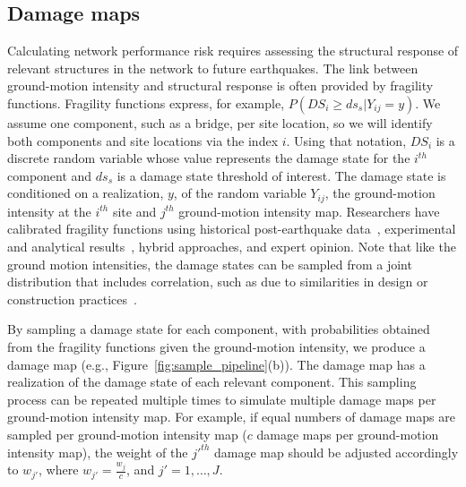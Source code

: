 \subsection{Damage maps}
Calculating network performance risk requires assessing the structural response of relevant structures in the network to future earthquakes. The link between ground-motion intensity and structural response is often provided by fragility functions. Fragility functions express, for example, $P(DS_i \geq ds_s | Y_{ij} = y)$. We assume one component, such as a bridge, per site location, so we will identify both components and site locations via the index $i$. Using that notation, $DS_i$ is a discrete random variable whose value represents the damage state for the $i^{th}$ component and $ds_s$ is a damage state threshold of interest. The damage state is conditioned on a realization, $y$, of the random variable $Y_{ij}$, the ground-motion intensity at the $i^{th}$ site and $j^{th}$ ground-motion intensity map. Researchers have calibrated fragility functions using historical post-earthquake data~\cite[e.g.,][]{basoz_enhancement_1999}, experimental and analytical results~\cite[e.g.,][]{ramanathan_analytical_2010}, hybrid approaches, and expert opinion. Note that like the ground motion intensities, the damage states can be sampled from a joint distribution that includes correlation, such as due to similarities in design or construction practices~\cite[e.g.,][]{lee_uncertainty_2007,baker_introducing_2008}. 

By sampling a damage state for each component, with probabilities obtained from the fragility functions given the ground-motion intensity, we produce a damage map (e.g., Figure~\ref{fig:sample_pipeline}{\color{red}(b)}). The damage map has a realization of the damage state of each relevant component. This sampling process can be repeated multiple times to simulate multiple damage maps per ground-motion intensity map. For example, if equal numbers of damage maps are sampled per ground-motion intensity map ($c$ damage maps per ground-motion intensity map), the weight of the $j'^{th}$ damage map should be adjusted accordingly to $w_{j'}$, where $w_{j'} = \frac{w_j}{c}$, and $j' = 1, \ldots, J$. 

